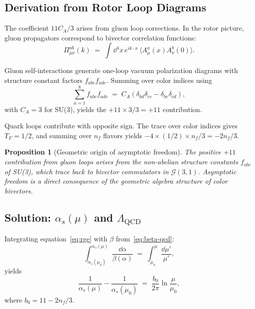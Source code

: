 \documentclass[11pt,a4paper]{article}
\newcommand{\Cl}{\mathcal{G}}
\theoremstyle{definition}
\theoremstyle{plain}
\newtheorem{proposition}{Proposition}[section]
\theoremstyle{remark}
\begin{document}
\subsection{Derivation from Rotor Loop Diagrams}

The coefficient $11C_A/3$ arises from gluon loop corrections. In the rotor picture, gluon propagators correspond to bivector correlation functions:
\begin{equation}
\Pi_{\mu\nu}^{ab}(k) \;=\; \int \dd^4x \, e^{ik \cdot x}\,\langle A_\mu^a(x) A_\nu^b(0) \rangle.
\end{equation}

Gluon self-interactions generate one-loop vacuum polarization diagrams with structure constant factors $f_{abc}f_{ade}$. Summing over color indices using
\begin{equation}
\sum_{a=1}^8 f_{abc}f_{ade} \;=\; C_A(\delta_{bd}\delta_{ce} - \delta_{be}\delta_{cd}),
\end{equation}
with $C_A = 3$ for SU(3), yields the $+11 \times 3/3 = +11$ contribution.

Quark loops contribute with opposite sign. The trace over color indices gives $T_F = 1/2$, and summing over $n_f$ flavors yields $-4 \times (1/2) \times n_f / 3 = -2n_f/3$.

\begin{proposition}[Geometric origin of asymptotic freedom]
The positive $+11$ contribution from gluon loops arises from the non-abelian structure constants $f_{abc}$ of SU(3), which trace back to bivector commutators in $\Cl(3,1)$. Asymptotic freedom is a direct consequence of the geometric algebra structure of color bivectors.
\end{proposition}

\subsection{Solution: $\alpha_s(\mu)$ and $\Lambda_{\mathrm{QCD}}$}

Integrating equation~\eqref{eq:rge} with $\beta$ from~\eqref{eq:beta-qcd}:
\begin{equation}
\int_{\alpha_s(\mu_0)}^{\alpha_s(\mu)} \frac{\dd\alpha}{\beta(\alpha)} \;=\; \int_{\mu_0}^\mu \frac{\dd\mu'}{\mu'},
\end{equation}
yields
\begin{equation}
\frac{1}{\alpha_s(\mu)} - \frac{1}{\alpha_s(\mu_0)} \;=\; \frac{b_0}{2\pi}\ln\frac{\mu}{\mu_0},
\end{equation}
where $b_0 = 11 - 2n_f/3$.
\end{document}
